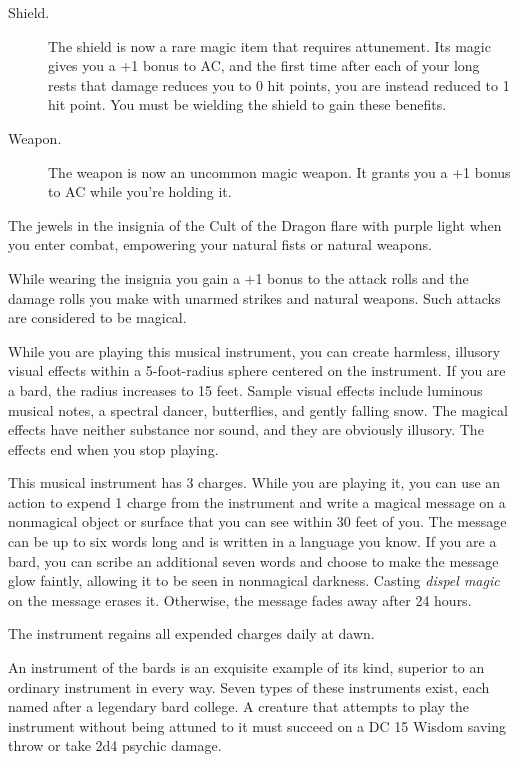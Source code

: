 \documentclass[10pt,a4paper,twoside,bg=print,twocolumn,openany,nodeprecatedcode]{dndbook}
\begin{document}
\begin{description}
\item[Shield.]
The shield is now a rare magic item that requires attunement. Its magic gives you a +1 bonus to AC, and the first time after each of your long rests that damage reduces you to 0 hit points, you are instead reduced to 1 hit point. You must be wielding the shield to gain these benefits.
\item[Weapon.]
The weapon is now an uncommon magic weapon. It grants you a +1 bonus to AC while you're holding it.
\end{description}

The jewels in the insignia of the Cult of the Dragon flare with purple light when you enter combat, empowering your natural fists or natural weapons.

While wearing the insignia you gain a +1 bonus to the attack rolls and the damage rolls you make with unarmed strikes and natural weapons. Such attacks are considered to be magical.

While you are playing this musical instrument, you can create harmless, illusory visual effects within a 5-foot-radius sphere centered on the instrument. If you are a bard, the radius increases to 15 feet. Sample visual effects include luminous musical notes, a spectral dancer, butterflies, and gently falling snow. The magical effects have neither substance nor sound, and they are obviously illusory. The effects end when you stop playing.

This musical instrument has 3 charges. While you are playing it, you can use an action to expend 1 charge from the instrument and write a magical message on a nonmagical object or surface that you can see within 30 feet of you. The message can be up to six words long and is written in a language you know. If you are a bard, you can scribe an additional seven words and choose to make the message glow faintly, allowing it to be seen in nonmagical darkness. Casting \textit{dispel magic} on the message erases it. Otherwise, the message fades away after 24 hours.

The instrument regains all expended charges daily at dawn.

An instrument of the bards is an exquisite example of its kind, superior to an ordinary instrument in every way. Seven types of these instruments exist, each named after a legendary bard college. A creature that attempts to play the instrument without being attuned to it must succeed on a DC 15 Wisdom saving throw or take 2d4 psychic damage.
\end{document}
